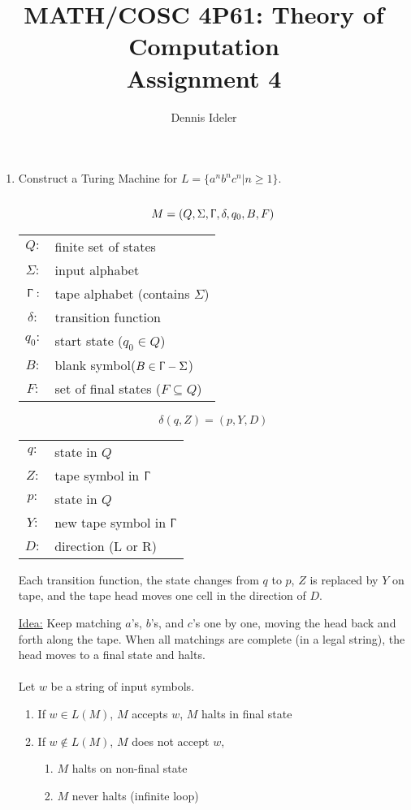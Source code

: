 \documentclass[10pt,a4paper,final]{article}
\author{Dennis Ideler}
\title{MATH/COSC 4P61: Theory of Computation\\Assignment 4}
\begin{document}
\maketitle

\begin{enumerate}
\item %
Construct a Turing Machine for $L = \{a^n b^n c^n | n \geq 1\}$. \\
\\
\begin{equation*}
M = (Q, \Sigma, \Upgamma, \delta, q_0, B, F)
\end{equation*}

\begin{tabular}{c l}
$Q:$ & finite set of states \\ 
$\Sigma:$ & input alphabet \\ 
$\Upgamma:$ & tape alphabet (contains $\Sigma$) \\
$\delta:$ & transition function \\
$q_0:$ & start state ($q_0 \in Q$) \\
$B:$ & blank symbol\footnotemark[1] ($B \in \Upgamma - \Sigma$) \\
$F:$ & set of final states ($F \subseteq Q$)
\end{tabular} 

\begin{equation*}
\delta (q, Z) = (p, Y, D)
\end{equation*}

\begin{tabular}{c l}
$q:$ & state in $Q$ \\ 
$Z:$ & tape symbol in $\Upgamma$ \\ 
$p:$ & state in $Q$ \\
$Y:$ & new tape symbol in $\Upgamma$ \\
$D:$ & direction (L or R)
\end{tabular}

Each transition function, the state changes from $q$ to $p$, $Z$ is replaced by $Y$ on tape,
and the tape head moves one cell in the direction of $D$.

\underline{Idea:} Keep matching $a$'s, $b$'s, and $c$'s one by one, moving the head back and forth
along the tape. When all matchings are complete (in a legal string),
the head moves to a final state and halts. \\
\\
Let $w$ be a string of input symbols.
\begin{enumerate}
  \item If $w \in L(M)$, $M$ accepts $w$, $M$ halts in final state
  \item If $w \notin L(M)$, $M$ does not accept $w$,
  \begin{enumerate}
    \item $M$ halts on non-final state
    \item $M$ never halts (infinite loop)
  \end{enumerate}
\end{enumerate}


\end{enumerate}
\end{document}
